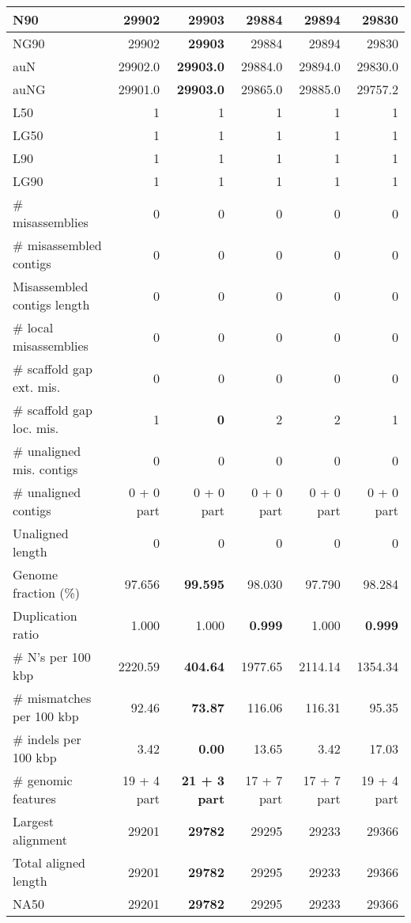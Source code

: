 \documentclass[12pt,a4paper]{article}
\begin{document}
\begin{table}[ht]
\begin{center}
\begin{tabular}{|l*{5}{|r}|}
N90 & 29902 & {\bf 29903} & 29884 & 29894 & 29830 \\ \hline
NG90 & 29902 & {\bf 29903} & 29884 & 29894 & 29830 \\ \hline
auN & 29902.0 & {\bf 29903.0} & 29884.0 & 29894.0 & 29830.0 \\ \hline
auNG & 29901.0 & {\bf 29903.0} & 29865.0 & 29885.0 & 29757.2 \\ \hline
L50 & 1 & 1 & 1 & 1 & 1 \\ \hline
LG50 & 1 & 1 & 1 & 1 & 1 \\ \hline
L90 & 1 & 1 & 1 & 1 & 1 \\ \hline
LG90 & 1 & 1 & 1 & 1 & 1 \\ \hline
\# misassemblies & 0 & 0 & 0 & 0 & 0 \\ \hline
\# misassembled contigs & 0 & 0 & 0 & 0 & 0 \\ \hline
Misassembled contigs length & 0 & 0 & 0 & 0 & 0 \\ \hline
\# local misassemblies & 0 & 0 & 0 & 0 & 0 \\ \hline
\# scaffold gap ext. mis. & 0 & 0 & 0 & 0 & 0 \\ \hline
\# scaffold gap loc. mis. & 1 & {\bf 0} & 2 & 2 & 1 \\ \hline
\# unaligned mis. contigs & 0 & 0 & 0 & 0 & 0 \\ \hline
\# unaligned contigs & 0 + 0 part & 0 + 0 part & 0 + 0 part & 0 + 0 part & 0 + 0 part \\ \hline
Unaligned length & 0 & 0 & 0 & 0 & 0 \\ \hline
Genome fraction (\%) & 97.656 & {\bf 99.595} & 98.030 & 97.790 & 98.284 \\ \hline
Duplication ratio & 1.000 & 1.000 & {\bf 0.999} & 1.000 & {\bf 0.999} \\ \hline
\# N's per 100 kbp & 2220.59 & {\bf 404.64} & 1977.65 & 2114.14 & 1354.34 \\ \hline
\# mismatches per 100 kbp & 92.46 & {\bf 73.87} & 116.06 & 116.31 & 95.35 \\ \hline
\# indels per 100 kbp & 3.42 & {\bf 0.00} & 13.65 & 3.42 & 17.03 \\ \hline
\# genomic features & 19 + 4 part & {\bf 21 + 3 part} & 17 + 7 part & 17 + 7 part & 19 + 4 part \\ \hline
Largest alignment & 29201 & {\bf 29782} & 29295 & 29233 & 29366 \\ \hline
Total aligned length & 29201 & {\bf 29782} & 29295 & 29233 & 29366 \\ \hline
NA50 & 29201 & {\bf 29782} & 29295 & 29233 & 29366 \\ \hline

\end{tabular}
\end{center}
\end{table}
\end{document}

